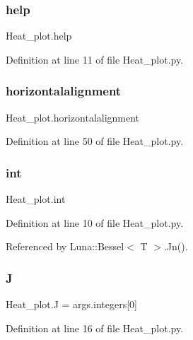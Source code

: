 \subsubsection{\texorpdfstring{help}{help}}
{\footnotesize\ttfamily Heat\+\_\+plot.\+help}



Definition at line 11 of file Heat\+\_\+plot.\+py.

\mbox{\label{namespaceHeat__plot_ae47186a7b326f77755c609346bee51aa}} 
\subsubsection{\texorpdfstring{horizontalalignment}{horizontalalignment}}
{\footnotesize\ttfamily Heat\+\_\+plot.\+horizontalalignment}



Definition at line 50 of file Heat\+\_\+plot.\+py.

\mbox{\label{namespaceHeat__plot_ac721620fed23609e47f849d804f29546}} 
\subsubsection{\texorpdfstring{int}{int}}
{\footnotesize\ttfamily Heat\+\_\+plot.\+int}



Definition at line 10 of file Heat\+\_\+plot.\+py.



Referenced by Luna\+::\+Bessel$<$ T $>$.\+Jn().

\mbox{\label{namespaceHeat__plot_a3cafcec38d886f33b35756791964bb58}} 
\subsubsection{\texorpdfstring{J}{J}}
{\footnotesize\ttfamily Heat\+\_\+plot.\+J = args.\+integers\mbox{[}0\mbox{]}}



Definition at line 16 of file Heat\+\_\+plot.\+py.



